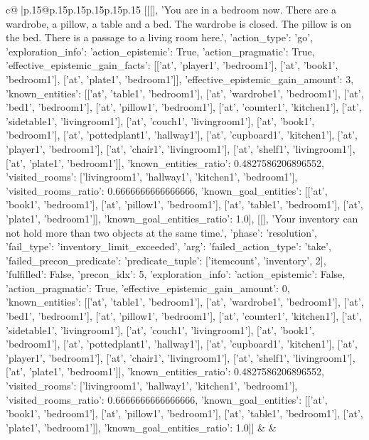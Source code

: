 \documentclass{article}
\begin{document}
{\begin{supertabular}{c@{$\;$}|p{.15\linewidth}@{}p{.15\linewidth}p{.15\linewidth}p{.15\linewidth}p{.15\linewidth}p{.15\linewidth}}
{{{	 [[[], 'You are in a bedroom now. There are a wardrobe, a pillow, a table and a bed. The wardrobe is closed. The pillow is on the bed. There is a passage to a living room here.', {'action_type': 'go', 'exploration_info': {'action_epistemic': True, 'action_pragmatic': True, 'effective_epistemic_gain_facts': [['at', 'player1', 'bedroom1'], ['at', 'book1', 'bedroom1'], ['at', 'plate1', 'bedroom1']], 'effective_epistemic_gain_amount': 3, 'known_entities': [['at', 'table1', 'bedroom1'], ['at', 'wardrobe1', 'bedroom1'], ['at', 'bed1', 'bedroom1'], ['at', 'pillow1', 'bedroom1'], ['at', 'counter1', 'kitchen1'], ['at', 'sidetable1', 'livingroom1'], ['at', 'couch1', 'livingroom1'], ['at', 'book1', 'bedroom1'], ['at', 'pottedplant1', 'hallway1'], ['at', 'cupboard1', 'kitchen1'], ['at', 'player1', 'bedroom1'], ['at', 'chair1', 'livingroom1'], ['at', 'shelf1', 'livingroom1'], ['at', 'plate1', 'bedroom1']], 'known_entities_ratio': 0.4827586206896552, 'visited_rooms': ['livingroom1', 'hallway1', 'kitchen1', 'bedroom1'], 'visited_rooms_ratio': 0.6666666666666666, 'known_goal_entities': [['at', 'book1', 'bedroom1'], ['at', 'pillow1', 'bedroom1'], ['at', 'table1', 'bedroom1'], ['at', 'plate1', 'bedroom1']], 'known_goal_entities_ratio': 1.0}}], [[], 'Your inventory can not hold more than two objects at the same time.', {'phase': 'resolution', 'fail_type': 'inventory_limit_exceeded', 'arg': {'failed_action_type': 'take', 'failed_precon_predicate': {'predicate_tuple': ['itemcount', 'inventory', 2], 'fulfilled': False, 'precon_idx': 5}}, 'exploration_info': {'action_epistemic': False, 'action_pragmatic': True, 'effective_epistemic_gain_amount': 0, 'known_entities': [['at', 'table1', 'bedroom1'], ['at', 'wardrobe1', 'bedroom1'], ['at', 'bed1', 'bedroom1'], ['at', 'pillow1', 'bedroom1'], ['at', 'counter1', 'kitchen1'], ['at', 'sidetable1', 'livingroom1'], ['at', 'couch1', 'livingroom1'], ['at', 'book1', 'bedroom1'], ['at', 'pottedplant1', 'hallway1'], ['at', 'cupboard1', 'kitchen1'], ['at', 'player1', 'bedroom1'], ['at', 'chair1', 'livingroom1'], ['at', 'shelf1', 'livingroom1'], ['at', 'plate1', 'bedroom1']], 'known_entities_ratio': 0.4827586206896552, 'visited_rooms': ['livingroom1', 'hallway1', 'kitchen1', 'bedroom1'], 'visited_rooms_ratio': 0.6666666666666666, 'known_goal_entities': [['at', 'book1', 'bedroom1'], ['at', 'pillow1', 'bedroom1'], ['at', 'table1', 'bedroom1'], ['at', 'plate1', 'bedroom1']], 'known_goal_entities_ratio': 1.0}}]] 
	  } 
	   } 
	   } 
	 & & \\ 
 

    \theutterance {}  


\end{supertabular}}
\end{document}
